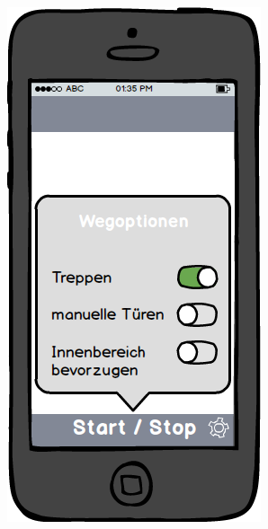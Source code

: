 \begin{figure}[ht]
\centering
\begin{minipage}[b]{.5\textwidth}
  \centering
  \includegraphics[width=.8\linewidth]{img/wegoptionen-mockup.png}
  \label{img:wegoptionen-mockup}
\end{minipage}%
\begin{minipage}[b]{.5\textwidth}
  \centering

\end{minipage}
\end{figure}
